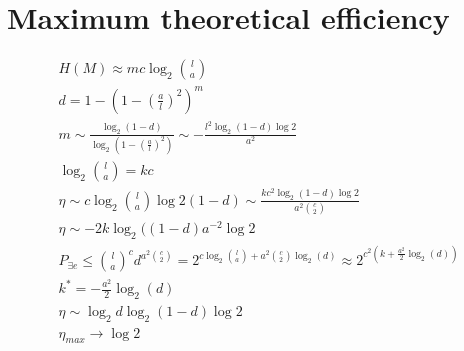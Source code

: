 \documentclass[english,11pt,twocolumn]{article}
\renewcommand{\le}{\leqslant}
\theoremstyle{definition}
\begin{document}
	\section{Maximum theoretical efficiency}
		\begin{align*}
			H(M) \approx m c \log_2 {l \choose a}\\
			d = 1 - \left (1- \left(\frac{a}{l}\right)^2 \right)^m\\
			m \sim \frac{\log_2(1-d)}{\log_2(1-(\frac{a}{l})^2)} \sim - \frac{l^2 \log_2(1-d) \log 2}{a^2}\\
			\log_2 {l \choose a} = k c\\
			\eta \sim c \log_2 {l \choose a} \log2(1-d) \sim \frac{k c^2 \log_2(1-d)\log 2}{a^2 {c \choose 2}}\\
			\eta \sim - 2 k  \log_2 ((1-d)a^{-2}\log 2\\
			P_{\exists e} \le {l \choose a}^c d^{a^2 {c \choose 2}} = 2^{c \log_ 2 {l \choose a} + a^2 {c \choose 2 }\log_2(d)} \approx 2^{c^2(k + \frac{a^2}{2} \log_2 (d))}\\
			k^* = -\frac{a^2}{2} \log_2 (d)\\
			\eta \sim \log_2 d \log_2 (1-d) \log 2\\
			\eta_{max} \rightarrow \log 2
		\end{align*}
	
	\nocite{*}
         
\end{document}
